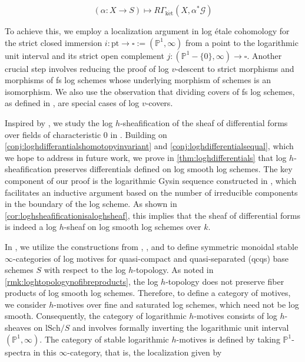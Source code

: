 \documentclass[10pt]{amsart}
\newcommand{\cG}{\mathcal{G}}
\newcommand{\ket}{\mathrm{k\acute{e}t}}
\newcommand{\lSch}{\mathrm{lSch}}
\newcommand{\pt}{\mathrm{pt}}
\begin{document}
\[
(\alpha \colon X \to S) \mapsto R\Gamma_{\ket}(X,\alpha^*\cG)
\]

To achieve this, we employ a localization argument in log étale cohomology for the strict closed immersion \( i\colon\pt\rightarrow\square:= (\mathbb{P}^1,\infty) \) from a point to the logarithmic unit interval and its strict open complement \( j\colon(\mathbb{P}^1-\{0\},\infty)\rightarrow\square \). Another crucial step involves reducing the proof of log \( v \)-descent to strict morphisms and morphisms of fs log schemes whose underlying morphism of schemes is an isomorphism. We also use the observation that dividing covers of fs log schemes, as defined in \cite{logDM}, are special cases of log \( v \)-covers.

Inspired by \cite{HuberJorder}, we study the log \( h \)-sheafification of the sheaf of differential forms over fields of characteristic \( 0 \) in . Building on 
\cref{conj:loghdifferantialshomotopyinvariant} and \cref{conj:loghdifferentialsequal}, which we hope to address in future work, we prove in \cref{thm:loghdifferentials} that log \( h \)-sheafification preserves differentials defined on log smooth log schemes. The key component of our proof is the logarithmic Gysin sequence constructed in \cite{logDM}, which facilitates an inductive argument based on the number of irreducible components in the boundary of the log scheme. As shown in \cref{cor:loghsheafificationisaloghsheaf}, this implies that the sheaf of differential forms is indeed a log \( h \)-sheaf on log smooth log schemes over \( k \).

In , we utilize the constructions from \cite{logDMcras}, \cite{logDM}, and \cite{logSH} to define symmetric monoidal stable \( \infty \)-categories of log motives for quasi-compact and quasi-separated (qcqs) base schemes \( S \) with respect to the log \( h \)-topology. As noted in \cref{rmk:loghtopologynofibreproducts}, the log \( h \)-topology does not preserve fiber products of log smooth log schemes. Therefore, to define a category of motives, we consider \( h \)-motives over fine and saturated log schemes, which need not be log smooth. Consequently, the category of logarithmic \( h \)-motives consists of log \( h \)-sheaves on \( \lSch/S \) and involves formally inverting the logarithmic unit interval \( (\mathbb{P}^1, \infty) \). The category of stable logarithmic \( h \)-motives is defined by taking \( \mathbb{P}^1 \)-spectra in this \( \infty \)-category, that is, the localization given by 
\end{document}
